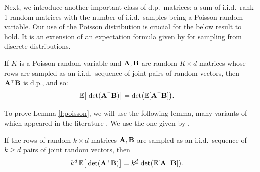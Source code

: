 \documentclass[../../thesis.tex]{subfiles}
\begin{document}
Next, we introduce another important class of d.p.~matrices:
a sum of i.i.d.~rank-1 random matrices with the number of
i.i.d.~samples being a Poisson random variable. Our use of the Poisson
distribution is crucial for the below result to hold. It is an
extension of an expectation formula given by \cite{dpp-intermediate}
for sampling from discrete distributions.
\begin{lemma}\label{l:poisson}
  If $K$ is a Poisson random variable and $\mathbf A,\mathbf B$ are random $K\times d$
  matrices whose rows  are sampled as an i.i.d.~sequence of joint pairs of
  random vectors, then $\A^\top\B$ is d.p., and so:
  \begin{align*}
    \E\big[\det(\A^\top\B)\big] & = \det\!\big(\E[\A^\top\B]\big).
  \end{align*}
\end{lemma}

To prove Lemma \ref{l:poisson}, we will use the following
lemma, many variants of which appeared in the literature
\cite[e.g.,][]{expected-generalized-variance}. We use the one given by
\cite{correcting-bias}.
\begin{lemma}\label{l:cb}
  If the rows of random $k\times d$ matrices $\mathbf A,\mathbf B$
  are sampled as an i.i.d.~sequence of $k\geq d$ pairs of joint random vectors, then
  \begin{align}
    k^d\,\E \big[\det(\A^\top\B)\big]
     & = \ktd\,\det\!\big(\E[\A^\top\B]\big).
  \end{align}
\end{lemma}
\end{document}
